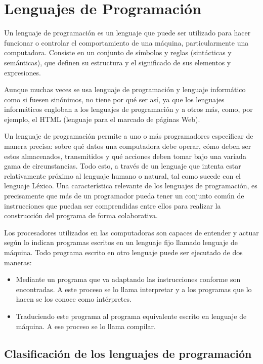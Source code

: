 \documentclass[12pt,legalpaper]{report}
\begin{document}
	\section{Lenguajes de Programación}

Un lenguaje de programación es un lenguaje que puede ser utilizado para hacer funcionar o controlar el comportamiento de una máquina, particularmente una computadora. Consiste en un conjunto de símbolos y reglas (sintácticas y semánticas), que definen su estructura y el significado de sus elementos y expresiones.

Aunque muchas veces se usa lenguaje de programación y lenguaje informático como si fuesen sinónimos, no tiene por qué ser así, ya que los lenguajes informáticos engloban a los lenguajes de programación y a otros más, como, por ejemplo, el HTML (lenguaje para el marcado de páginas Web).

Un lenguaje de programación permite a uno o más programadores especificar de manera precisa: sobre qué datos una computadora debe operar, cómo deben ser estos almacenados, transmitidos y qué acciones deben tomar bajo una variada gama de circunstancias. Todo esto, a través de un lenguaje que intenta estar relativamente próximo al lenguaje humano o natural, tal como sucede con el lenguaje Léxico. Una característica relevante de los lenguajes de programación, es precisamente que más de un programador pueda tener un conjunto común de instrucciones que puedan ser comprendidas entre ellos para realizar la construcción del programa de forma colaborativa.

Los procesadores utilizados en las computadoras son capaces de entender y actuar según lo indican programas escritos en un lenguaje fijo llamado lenguaje de máquina. Todo programa escrito en otro lenguaje puede ser ejecutado de dos maneras:

\begin{itemize}
	\item Mediante un programa que va adaptando las instrucciones conforme son encontradas. A este proceso se lo llama interpretar y a los programas que lo hacen se los conoce como intérpretes.
	\item Traduciendo este programa al programa equivalente escrito en lenguaje de máquina. A ese proceso se lo llama compilar.
\end{itemize}

		\subsection{Clasificación de los lenguajes de programación}
\end{document}
